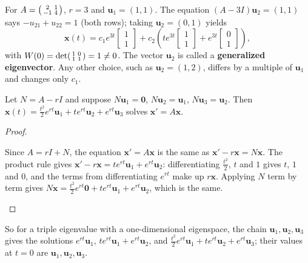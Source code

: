 \documentclass[10pt]{scrartcl}
\newcommand{\vv}[1]{\mathbf{#1}}
\begin{document}
\begin{example*}
  For $A=\begin{psmallmatrix}2&1\\-1&4\end{psmallmatrix}$, $r=3$ and $\vv u_1=(1,1)$. The equation $(A-3I)\vv u_2=(1,1)$ says $-u_{21}+u_{22}=1$ (both rows); taking $\vv u_2=(0,1)$ yields
  \[
    \vv x(t) = c_1 e^{3t}\begin{bmatrix}1\\1\end{bmatrix} + c_2\left(te^{3t}\begin{bmatrix}1\\1\end{bmatrix} + e^{3t}\begin{bmatrix}0\\1\end{bmatrix}\right),
  \]
  with $W(0)=\det\begin{psmallmatrix}1&0\\1&1\end{psmallmatrix}=1\neq 0$. The vector $\vv u_2$ is called a \textbf{generalized eigenvector}. Any other choice, such as $\vv u_2=(1,2)$, differs by a multiple of $\vv u_1$ and changes only $c_1$.
\end{example*}
\begin{proposition*}
  Let $N=A-rI$ and suppose $N\vv u_1=\vv 0$, $N\vv u_2=\vv u_1$, $N\vv u_3=\vv u_2$. Then $\vv x(t)=\frac{t^2}{2}e^{rt}\vv u_1+te^{rt}\vv u_2+e^{rt}\vv u_3$ solves $\vv x'=A\vv x$.
\end{proposition*}
\begin{proof}
  \begin{steps}
    \ii Since $A=rI+N$, the equation $\vv x'=A\vv x$ is the same as $\vv x'-r\vv x=N\vv x$.
    \ii The product rule gives $\vv x'-r\vv x=te^{rt}\vv u_1+e^{rt}\vv u_2$: differentiating $\frac{t^2}{2}$, $t$ and $1$ gives $t$, $1$ and $0$, and the terms from differentiating $e^{rt}$ make up $r\vv x$.
    \ii Applying $N$ term by term gives $N\vv x=\frac{t^2}{2}e^{rt}\vv 0+te^{rt}\vv u_1+e^{rt}\vv u_2$, which is the same. \qedhere
  \end{steps}
\end{proof}
\noindent So for a triple eigenvalue with a one-dimensional eigenspace, the chain $\vv u_1,\vv u_2,\vv u_3$ gives the solutions $e^{rt}\vv u_1$, $te^{rt}\vv u_1+e^{rt}\vv u_2$, and $\frac{t^2}{2}e^{rt}\vv u_1+te^{rt}\vv u_2+e^{rt}\vv u_3$; their values at $t=0$ are $\vv u_1,\vv u_2,\vv u_3$.
\end{document}
